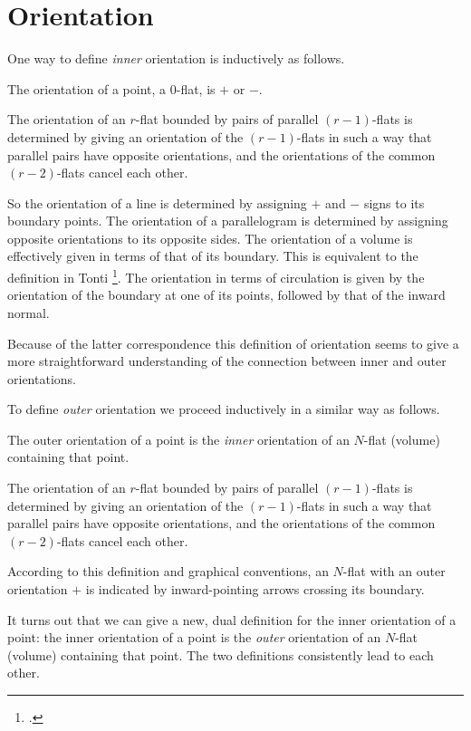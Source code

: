 \documentclass[\ifafour a4paper,12pt,\else a5paper,10pt,\fi%
onecolumn,oneside,article,%
british%
]{memoir}
\theoremstyle{remark}
\theoremstyle{innote}
\newcommand*{\citep}{\footcites}
\renewcommand*{\|}[1][]{\nonscript\,#1\vert\nonscript\;\mathopen{}}
\newcommand*{\chap}{ch.}%
\begin{document}
\section{Orientation}
\label{sec:orientation}

One way to define \emph{inner} orientation is inductively as follows.

The orientation of a point, a 0-flat, is $+$ or $-$.

The orientation of an $r$-flat bounded by pairs of parallel $(r-1)$-flats
is determined by giving an orientation of the $(r-1)$-flats in such a way
that parallel pairs have opposite orientations, and the orientations of the
common $(r-2)$-flats cancel each other.

So the orientation of a line is determined by assigning $+$ and $-$ signs
to its boundary points. The orientation of a parallelogram is determined by
assigning opposite orientations to its opposite sides. The orientation of a
volume is effectively given in terms of that of its boundary. This is
equivalent to the definition in Tonti \citep[\chap~3]{tonti2013}. The
orientation in terms of circulation is given by the orientation of the
boundary at one of its points, followed by that of the inward normal.

Because of the latter correspondence this definition of orientation seems
to give a more straightforward understanding of the connection between
inner and outer orientations.

\medskip

To define \emph{outer} orientation we proceed inductively in a similar way
as follows.

The outer orientation of a point is the \emph{inner} orientation of an
$N$-flat (volume) containing that point.

The orientation of an $r$-flat bounded by pairs of parallel $(r-1)$-flats
is determined by giving an orientation of the $(r-1)$-flats in such a way
that parallel pairs have opposite orientations, and the orientations of the
common $(r-2)$-flats cancel each other.

According to this definition and graphical conventions, an $N$-flat with an
outer orientation $+$ is indicated by inward-pointing arrows crossing its
boundary.

\medskip

It turns out that we can give a new, dual definition for the inner
orientation of a point: the inner orientation of a point is the
\emph{outer} orientation of an $N$-flat (volume) containing that point. The
two definitions consistently lead to each other.
\end{document}
